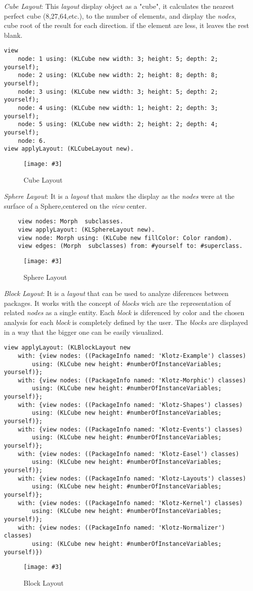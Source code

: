 \documentclass{sig-alternate}
\newcommand{\fig}[4]{
	\begin{figure}[#1]
		\centering
		\texttt{[image: \#3]}
		\caption{\label{fig:#3}#4}
	\end{figure}}
\begin{document}
\emph{Cube Layout}: This \emph{layout} display object as a "cube",
it calculates the nearest perfect cube (8,27,64,etc.), to the
number of elements, and display the \emph{nodes}, cube root 
of the result for each direction. if the element are less,
it leaves the rest blank.
\begin{lstlisting}
view 
	node: 1 using: (KLCube new width: 3; height: 5; depth: 2; yourself);
	node: 2 using: (KLCube new width: 2; height: 8; depth: 8; yourself);
	node: 3 using: (KLCube new width: 3; height: 5; depth: 2; yourself);
	node: 4 using: (KLCube new width: 1; height: 2; depth: 3; yourself);
	node: 5 using: (KLCube new width: 2; height: 2; depth: 4; yourself);
	node: 6.
view applyLayout: (KLCubeLayout new). 
\end{lstlisting}
\fig{}{0.2}{figure7.png}{Cube Layout}

\emph{Sphere Layout}: It is a \emph{layout} that makes the display
as the \emph{nodes} were at the surface of a Sphere,centered on the
\emph{view} center. 
\begin{lstlisting}
	view nodes: Morph  subclasses.
	view applyLayout: (KLSphereLayout new).
	view node: Morph using: (KLCube new fillColor: Color random).
	view edges: (Morph  subclasses) from: #yourself to: #superclass.
\end{lstlisting}
\fig{}{0.4}{figure8.png}{Sphere Layout}

\emph{Block Layout}: It is a \emph{layout} that can be used to 
analyze diferences between packages. It works with the concept
of \emph{blocks} wich are the representation of related \emph{nodes}
as a single entity. Each \emph{block} is diferenced by color and the
chosen analysis for each \emph{block} is completely defined by the
user. The \emph{blocks} are displayed in a way that the bigger one
can be easily visualized.
\begin{lstlisting}
view applyLayout: (KLBlockLayout new
	with: {view nodes: ((PackageInfo named: 'Klotz-Example') classes) 
		using: (KLCube new height: #numberOfInstanceVariables; yourself)};
	with: {view nodes: ((PackageInfo named: 'Klotz-Morphic') classes)
		using: (KLCube new height: #numberOfInstanceVariables; yourself)};
	with: {view nodes: ((PackageInfo named: 'Klotz-Shapes') classes)
		using: (KLCube new height: #numberOfInstanceVariables; yourself)};
	with: {view nodes: ((PackageInfo named: 'Klotz-Events') classes)
		using: (KLCube new height: #numberOfInstanceVariables; yourself)};		
	with: {view nodes: ((PackageInfo named: 'Klotz-Easel') classes)
		using: (KLCube new height: #numberOfInstanceVariables; yourself)};
	with: {view nodes: ((PackageInfo named: 'Klotz-Layouts') classes)
		using: (KLCube new height: #numberOfInstanceVariables; yourself)};
	with: {view nodes: ((PackageInfo named: 'Klotz-Kernel') classes)
		using: (KLCube new height: #numberOfInstanceVariables; yourself)};
	with: {view nodes: ((PackageInfo named: 'Klotz-Normalizer') classes)
		using: (KLCube new height: #numberOfInstanceVariables; yourself)})
\end{lstlisting}
\fig{}{0.4}{figure9.png}{Block Layout}
\end{document}
